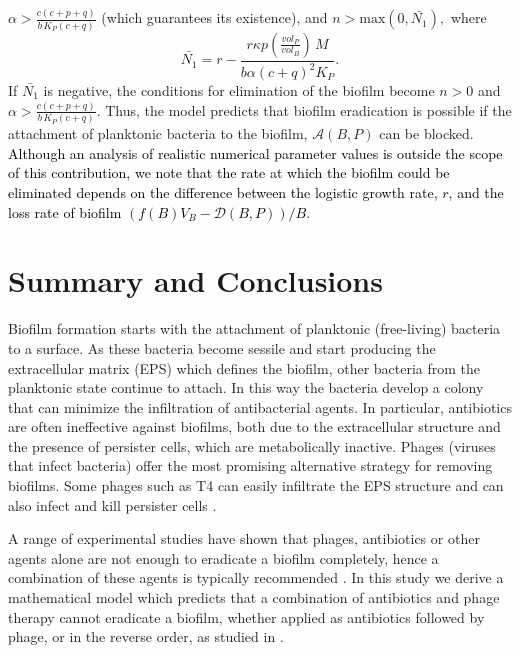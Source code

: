 $\alpha >\frac{c\left(c+p+q\right)}{b\, K_{P}(c+q)}$ (which guarantees its existence), and   $n > \text{max}(0, \bar{N_{1}}),$ where $$\bar{N_{1}}=r 
- \frac{r \kappa p (\frac{vol_P}{vol_B})\, M}{ b \alpha (c+q)^2 K_P}.$$ If $\bar{N_{1}}$ is negative, the conditions for elimination of the biofilm become $n>0$ and $\alpha >\frac{c\left(c+p+q\right)}{b\, K_{P}(c+q)}$.  Thus, the model predicts that biofilm eradication is possible if the attachment of planktonic bacteria to the biofilm, $\mathcal{A}(B,P)$ can be blocked. \textcolor{black}{Although an analysis of 
realistic numerical parameter values is outside the scope of this contribution, we note that the rate at which the biofilm
could be eliminated depends on the difference between the logistic growth rate, $r$, and the loss rate of biofilm $(f(B)V_B - \mathcal{D}(B,P))/B$.}

\section{Summary and Conclusions}

Biofilm formation starts with the attachment of planktonic (free-living) bacteria to a surface. As these bacteria become sessile and start producing the extracellular matrix (EPS) which defines the biofilm, other bacteria from the planktonic state continue to attach. In this way the bacteria develop a colony that can minimize the infiltration of antibacterial agents. In particular, antibiotics are often ineffective against biofilms, both due to the extracellular structure and the presence of persister cells, which are metabolically inactive. Phages (viruses that infect bacteria) offer the most promising alternative strategy for removing biofilms. Some phages such as T4 can easily infiltrate the EPS structure and can also infect and kill persister cells \citep{harper_bacteriophages_2014}.

A range of experimental studies have shown that phages, antibiotics or other agents alone are not enough to eradicate a biofilm completely, hence a combination of these agents is typically recommended \citep{chaudhry_synergy_2017, ryan_synergistic_2012}.
In this study we derive a mathematical model which predicts that a combination of antibiotics and phage therapy cannot eradicate a biofilm, whether applied as antibiotics followed by phage, or in the reverse order, as studied in \citep{chaudhry_synergy_2017}. 


